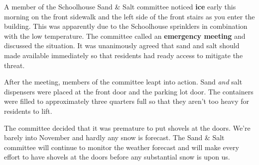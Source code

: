 \documentclass[letterpaper,12pt]{texMemo}
\begin{document}
\maketitle

A member of the Schoolhouse Sand \& Salt committee noticed
\textbf{ice} early this morning on the front sidewalk and the left
side of the front stairs as you enter the building. This was
apparently due to the Schoolhouse sprinklers in combination with the
low temperature. The committee called an \textbf{emergency meeting}
and discussed the situation. It was unanimously agreed that sand and
salt should made available immediately so that residents had ready
access to mitigate the threat.

After the meeting, members of the committee leapt into action. Sand
\emph{and} salt dispensers were placed at the front door and the
parking lot door. The containers were filled to approximately three
quarters full so that they aren't too heavy for residents to lift.

The committee decided that it was premature to put shovels at the
doors. We're barely into November and hardly any snow is forecast. The
Sand \& Salt committee will continue to monitor the weather forecast
and will make every effort to have shovels at the doors before any
substantial snow is upon us.
\end{document}
